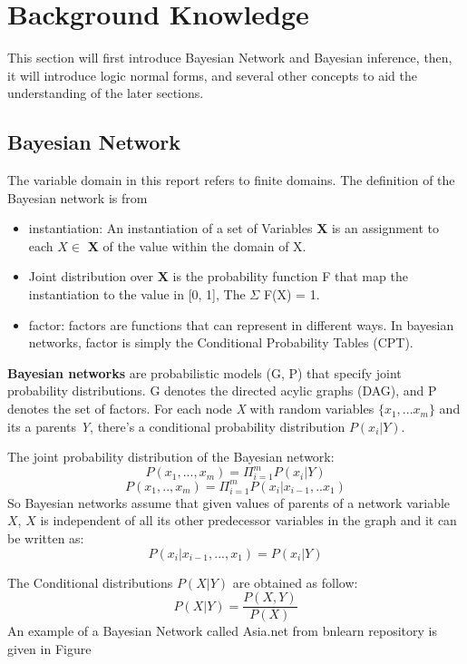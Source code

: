 \newpage
\section{Background Knowledge}
This section will first introduce Bayesian Network and Bayesian inference, then, it will introduce logic normal forms, and several other concepts to aid the understanding of the later sections.
    \subsection{Bayesian Network}
    The variable domain in this report refers to finite domains. The definition of the Bayesian network is from \cite{2008-literature-review}\\
    \begin{itemize}
        \item instantiation: An instantiation of a set of Variables \textbf{X} is an assignment to each $X \in$ \textbf{X} of the value within the domain of X.
        \item Joint distribution over \textbf{X} is the probability function F that map the instantiation to the value in [0, 1], The $\Sigma$ F(X) = 1.
        \item factor: factors are functions that can represent in different ways. In bayesian networks, factor is simply the Conditional Probability Tables (CPT).
    \end{itemize}
    \textbf{Bayesian networks} are probabilistic models (G, P) that specify joint probability distributions. G denotes the directed acylic graphs (DAG), and P denotes the set of factors. For each node \textit{X} with random variables $\{x_{1}, ... x_{m}\}$ and its a parents \textit{Y}, there's a conditional probability distribution $P(x_{i}|Y)$. \par
    
    The joint probability distribution of the Bayesian network: 
    $$P(x_{1}, ... , x_{m}) = \Pi_{i = 1}^{m} P(x_{i}|Y)$$
    $$P(x_{1},.., x_{m}) = \Pi_{i = 1}^{m}P(x_{i}|x_{i - 1}, .. x_{1})$$
    So Bayesian networks assume that given values of parents of a network variable $X$, $X$ is independent of all its other predecessor variables in the graph and it can be written as: $$P(x_{i}|x_{i- 1}, ..., x_{1}) = P(x_{i}|Y)$$
    
    The Conditional distributions $P(X|Y)$ are obtained as follow:
    $$P(X|Y) = \frac{P(X,Y)}{P(X)}$$
    An example of a Bayesian Network called Asia.net from bnlearn repository is given in Figure 
    
